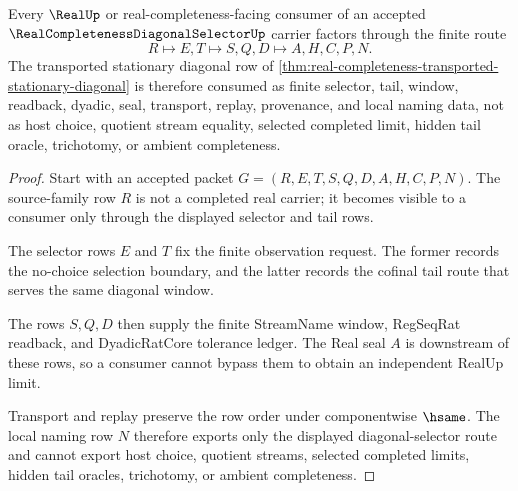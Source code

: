 \begin{theorem}
\label{thm:real-completeness-diagonal-selector-nonescape}
Every $\RealUp$ or real-completeness-facing consumer of an accepted $\RealCompletenessDiagonalSelectorUp$ carrier factors through the finite route
$$
R \longmapsto E,T \longmapsto S,Q,D \longmapsto A,H,C,P,N .
$$
The transported stationary diagonal row of \autoref{thm:real-completeness-transported-stationary-diagonal} is therefore consumed as finite selector, tail, window, readback, dyadic, seal, transport, replay, provenance, and local naming data, not as host choice, quotient stream equality, selected completed limit, hidden tail oracle, trichotomy, or ambient completeness.
\end{theorem}
\begin{proof}
Start with an accepted packet $G=(R,E,T,S,Q,D,A,H,C,P,N)$. The source-family row $R$ is not a completed real carrier; it becomes visible to a consumer only through the displayed selector and tail rows.

The selector rows $E$ and $T$ fix the finite observation request. The former records the no-choice selection boundary, and the latter records the cofinal tail route that serves the same diagonal window.

The rows $S,Q,D$ then supply the finite StreamName window, RegSeqRat readback, and DyadicRatCore tolerance ledger. The Real seal $A$ is downstream of these rows, so a consumer cannot bypass them to obtain an independent RealUp limit.

Transport and replay preserve the row order under componentwise $\hsame$. The local naming row $N$ therefore exports only the displayed diagonal-selector route and cannot export host choice, quotient streams, selected completed limits, hidden tail oracles, trichotomy, or ambient completeness.
\end{proof}


